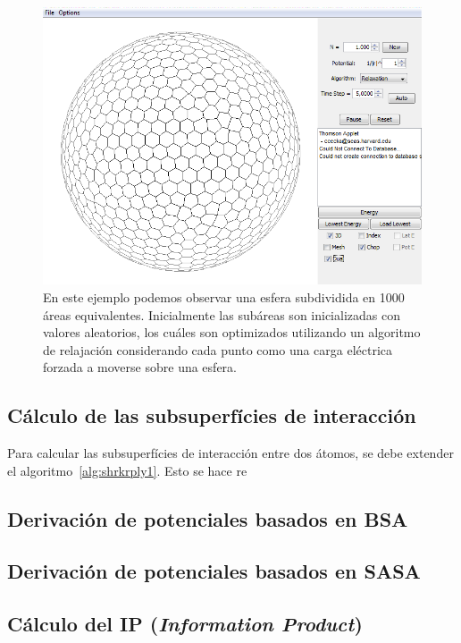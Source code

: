 \begin{figure}[p]
\centering
\centering
\includegraphics[width=\textwidth]{figures/thomson/thomson.png}
\caption[Esfera en el software Thomson Applet]{En este ejemplo podemos observar una esfera subdividida en 1000 áreas equivalentes. Inicialmente las subáreas son inicializadas con valores aleatorios, los cuáles son optimizados utilizando un algoritmo de relajación considerando cada punto como una carga eléctrica forzada a moverse sobre una esfera.}
\label{fig:thomsonfig}
\end{figure}
\cleardoublepage

\subsection{Cálculo de las subsuperfícies de interacción}
\par
Para calcular las subsuperfícies de interacción entre dos átomos, se debe extender el algoritmo~\ref{alg:shrkrply1}. Esto se hace re

\subsection{Derivación de potenciales basados en BSA}
\par
\subsection{Derivación de potenciales basados en SASA}
\par
\subsection{Cálculo del IP (\textit{Information Product})}
